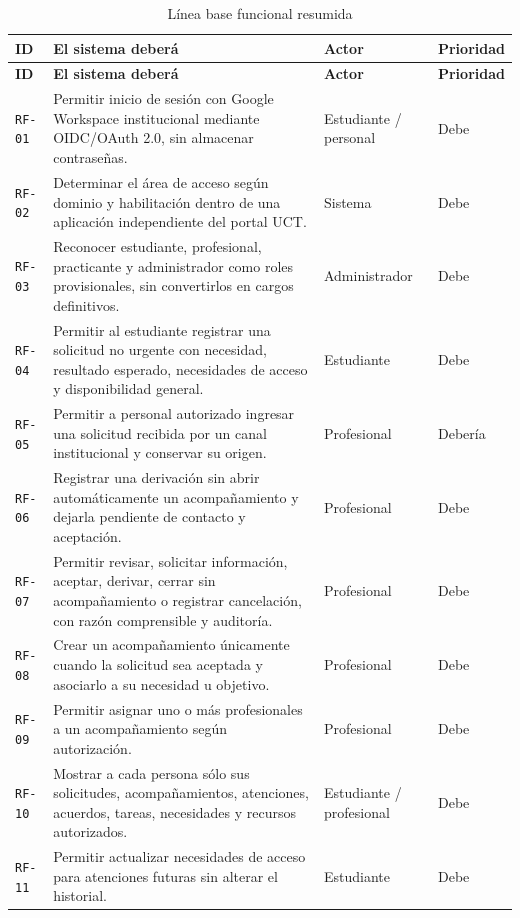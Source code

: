 \documentclass[10pt,a4paper,oneside]{article}
\newcommand{\id}[1]{\texttt{#1}}
\begin{document}
\scriptsize
\renewcommand{\arraystretch}{1.12}
\begin{longtable}{@{}L{0.065\textwidth}L{0.60\textwidth}L{0.15\textwidth}L{0.14\textwidth}@{}}
\caption{Línea base funcional resumida}\label{tab:rf-sintesis}\\
\toprule
\textbf{ID} & \textbf{El sistema deberá} & \textbf{Actor} & \textbf{Prioridad}\\
\midrule
\endfirsthead
\toprule\textbf{ID} & \textbf{El sistema deberá} & \textbf{Actor} & \textbf{Prioridad}\\\midrule
\endhead
\bottomrule
\endfoot
\id{RF-01} & Permitir inicio de sesión con Google Workspace institucional mediante OIDC/OAuth 2.0, sin almacenar contraseñas. & Estudiante / personal & Debe\\
\id{RF-02} & Determinar el área de acceso según dominio y habilitación dentro de una aplicación independiente del portal UCT. & Sistema & Debe\\
\id{RF-03} & Reconocer estudiante, profesional, practicante y administrador como roles provisionales, sin convertirlos en cargos definitivos. & Administrador & Debe\\
\id{RF-04} & Permitir al estudiante registrar una solicitud no urgente con necesidad, resultado esperado, necesidades de acceso y disponibilidad general. & Estudiante & Debe\\
\id{RF-05} & Permitir a personal autorizado ingresar una solicitud recibida por un canal institucional y conservar su origen. & Profesional & Debería\\
\id{RF-06} & Registrar una derivación sin abrir automáticamente un acompañamiento y dejarla pendiente de contacto y aceptación. & Profesional & Debe\\
\id{RF-07} & Permitir revisar, solicitar información, aceptar, derivar, cerrar sin acompañamiento o registrar cancelación, con razón comprensible y auditoría. & Profesional & Debe\\
\id{RF-08} & Crear un acompañamiento únicamente cuando la solicitud sea aceptada y asociarlo a su necesidad u objetivo. & Profesional & Debe\\
\id{RF-09} & Permitir asignar uno o más profesionales a un acompañamiento según autorización. & Profesional & Debe\\
\id{RF-10} & Mostrar a cada persona sólo sus solicitudes, acompañamientos, atenciones, acuerdos, tareas, necesidades y recursos autorizados. & Estudiante / profesional & Debe\\
\id{RF-11} & Permitir actualizar necesidades de acceso para atenciones futuras sin alterar el historial. & Estudiante & Debe\\

\end{longtable}
\end{document}
